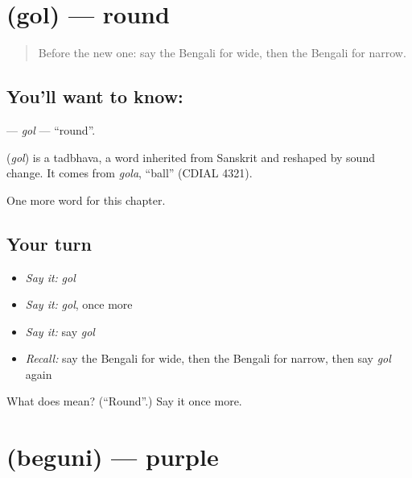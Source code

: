 \section[\texorpdfstring{\bn{গোল} (gol)}{গোল (gol)}]{ (gol) — round}

\label{lesson:BN-C136-gol}



\begin{quote}
Before the new one: say the Bengali for wide, then the Bengali for narrow.
\end{quote}

\subsection*{You'll want to know: }
\textbf{} — \emph{gol} — \textquotedblleft{}round\textquotedblright{}.

\begin{cousinweb}
\textbf{} (\emph{gol}) is a tadbhava, a word inherited from Sanskrit and reshaped by sound change. It comes from \emph{gola}, \textquotedblleft{}ball\textquotedblright{} (CDIAL 4321).
\end{cousinweb}

\begin{grammarlens}[title={What you've built}]
One more word for this chapter.
\end{grammarlens}

\subsection*{Your turn}
\begin{itemize}
\raggedright
  \item \emph{Say it:} \emph{gol}
  \item \emph{Say it:} \emph{gol}, once more
  \item \emph{Say it:} say \emph{gol}
  \item \emph{Recall:} say the Bengali for wide, then the Bengali for narrow, then say \emph{gol} again
\end{itemize}

\begin{tcolorbox}[breakable,colback=teal!4,colframe=teal!35!black,title={Before you move on}]
What does  mean? (\textquotedblleft{}Round\textquotedblright{}.) Say it once more.
\end{tcolorbox}
\section[\texorpdfstring{\bn{বেগুনি} (beguni)}{বেগুনি (beguni)}]{ (beguni) — purple}

